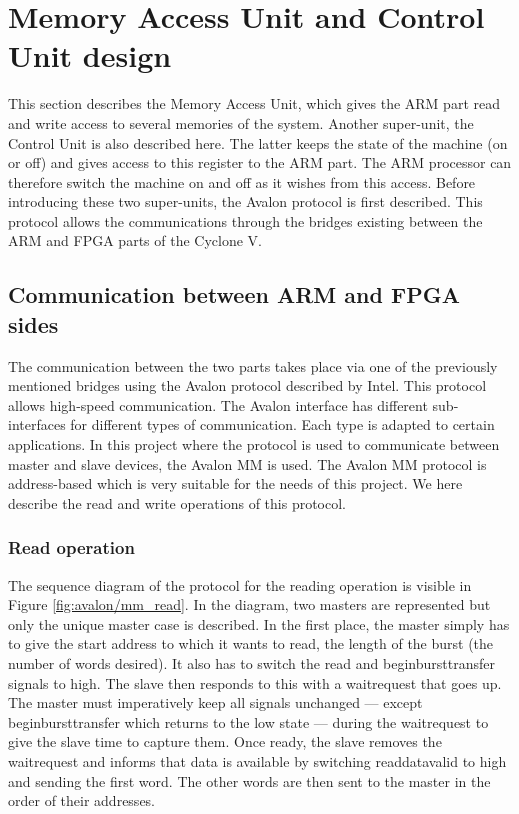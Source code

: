 \chapter{Memory Access Unit and Control Unit design}

This section describes the Memory Access Unit, which gives the ARM part read and write 
access to several memories of the system. Another super-unit, the Control Unit is also described here. 
The latter keeps the state of the machine (on or off) and gives access to this register to the 
ARM part. The ARM processor can therefore switch the machine on and off as it wishes from this 
access. Before introducing these two super-units, the Avalon protocol is first described. This 
protocol allows the communications through the bridges existing between the ARM and FPGA parts of
the Cyclone V.

\section{Communication between ARM and FPGA sides}

The communication between the two parts takes place via one of the previously mentioned bridges using 
the Avalon protocol described by Intel. This protocol allows 
high-speed communication. The Avalon interface has different sub-interfaces for different types 
of communication. Each type is adapted to certain applications. In this project where the protocol 
is used to communicate between master and slave devices, the Avalon MM is used. 
The Avalon MM protocol is address-based which is very suitable for the needs of this project.
We here describe the read and write operations of this protocol.

\subsection{Read operation}

The sequence diagram of the protocol for the reading operation is 
visible in Figure \ref{fig:avalon/mm_read}. In the diagram, two masters are represented but only 
the unique master case is described. In the first place, the master simply has to give
the start address to which it wants to read, the length of the burst (the number of words desired).  It also has to switch the read and beginbursttransfer signals to high.  The slave then responds 
to this with a waitrequest that goes up. The master must imperatively keep all signals unchanged --- except 
beginbursttransfer which returns to the low state --- during the waitrequest to give the 
slave time to capture them. Once ready, the slave removes the waitrequest and informs that  
data is available by switching readdatavalid to high and sending the first word. The other words 
are then sent to the master in the order of their addresses. 


